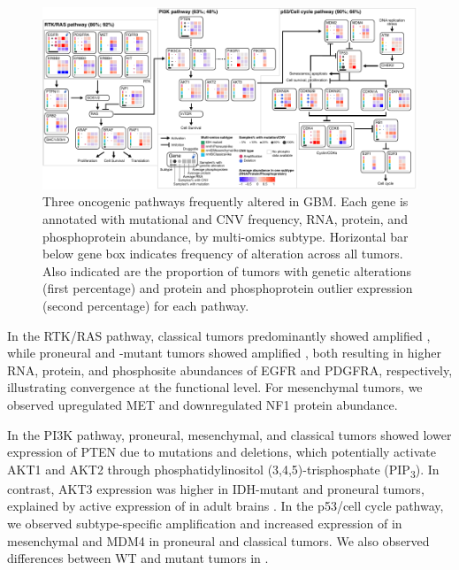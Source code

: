 \begin{figure}[tb]
    \centering
    \includegraphics[width=\linewidth]{figures/chap04_cptac_gbm_discov/figure7a_pathway_summary.pdf}
    \caption[Summary of pathway alterations.]{%
        Three oncogenic pathways frequently altered in GBM. Each gene is annotated with mutational and CNV frequency, RNA, protein, and phosphoprotein abundance, by multi-omics subtype. Horizontal bar below gene box indicates frequency of alteration across all tumors. Also indicated are the proportion of tumors with genetic alterations (first percentage) and protein and phosphoprotein outlier expression (second percentage) for each pathway.
    }
    \label{fig:gbm-pathway-summary}
\end{figure}

In the RTK/RAS pathway, classical tumors predominantly showed amplified , while proneural and -mutant tumors showed amplified , both resulting in higher RNA, protein, and phosphosite abundances of EGFR and PDGFRA, respectively, illustrating convergence at the functional level. For mesenchymal tumors, we observed upregulated MET and downregulated NF1 protein abundance.

In the PI3K pathway, proneural, mesenchymal, and classical tumors showed lower expression of PTEN due to mutations and deletions, which potentially activate AKT1 and AKT2 through phosphatidylinositol (3,4,5)-trisphosphate (PIP\textsubscript{3}). In contrast, AKT3 expression was higher in IDH-mutant and proneural tumors, explained by active expression of  in adult brains \cite{eastonrm_birnbaummj:RoleAkt32005}. In the p53/cell cycle pathway, we observed subtype-specific amplification and increased expression of  in mesenchymal and MDM4 in proneural and classical tumors. We also observed differences between  WT and mutant tumors in .

